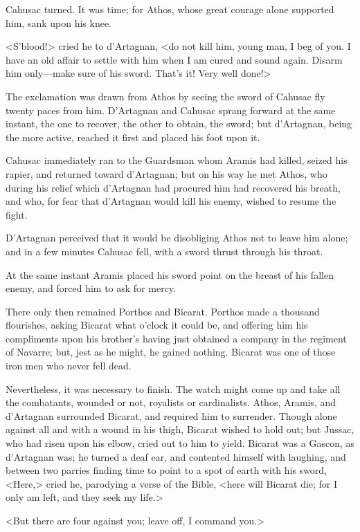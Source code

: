 Cahusac turned. It was time; for Athos, whose great courage alone supported him, sank upon his knee. 

<S'blood!> cried he to d'Artagnan, <do not kill him, young man, I beg of you. I have an old affair to settle with him when I am cured and sound again. Disarm him only---make sure of his sword. That's it! Very well done!> 

The exclamation was drawn from Athos by seeing the sword of Cahusac fly twenty paces from him. D'Artagnan and Cahusac sprang forward at the same instant, the one to recover, the other to obtain, the sword; but d'Artagnan, being the more active, reached it first and placed his foot upon it. 

Cahusac immediately ran to the Guardsman whom Aramis had killed, seized his rapier, and returned toward d'Artagnan; but on his way he met Athos, who during his relief which d'Artagnan had procured him had recovered his breath, and who, for fear that d'Artagnan would kill his enemy, wished to resume the fight. 

D'Artagnan perceived that it would be disobliging Athos not to leave him alone; and in a few minutes Cahusac fell, with a sword thrust through his throat. 

At the same instant Aramis placed his sword point on the breast of his fallen enemy, and forced him to ask for mercy. 

There only then remained Porthos and Bicarat. Porthos made a thousand flourishes, asking Bicarat what o'clock it could be, and offering him his compliments upon his brother's having just obtained a company in the regiment of Navarre; but, jest as he might, he gained nothing. Bicarat was one of those iron men who never fell dead. 

Nevertheless, it was necessary to finish. The watch might come up and take all the combatants, wounded or not, royalists or cardinalists. Athos, Aramis, and d'Artagnan surrounded Bicarat, and required him to surrender. Though alone against all and with a wound in his thigh, Bicarat wished to hold out; but Jussac, who had risen upon his elbow, cried out to him to yield. Bicarat was a Gascon, as d'Artagnan was; he turned a deaf ear, and contented himself with laughing, and between two parries finding time to point to a spot of earth with his sword, <Here,> cried he, parodying a verse of the Bible, <here will Bicarat die; for I only am left, and they seek my life.> 

<But there are four against you; leave off, I command you.> 

